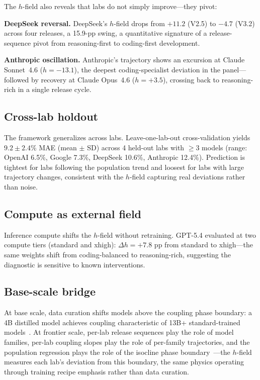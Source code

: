 \documentclass{article}
\begin{document}
The $h$-field also reveals that labs do not simply improve---they pivot:

\textbf{DeepSeek reversal.}
DeepSeek's $h$-field drops from $+11.2$ (V2.5) to $-4.7$ (V3.2) across four releases,
a 15.9-pp swing, a quantitative signature of a release-sequence pivot
from reasoning-first to coding-first development.

\textbf{Anthropic oscillation.}
Anthropic's trajectory shows an excursion at Claude Sonnet~4.6 ($h = -13.1$),
the deepest coding-specialist deviation in the panel---followed
by recovery at Claude Opus~4.6 ($h = +3.5$), crossing back to reasoning-rich in a single release cycle.

\subsection{Cross-lab holdout}

The framework generalizes across labs.
Leave-one-lab-out cross-validation yields $9.2 \pm 2.4$\% MAE (mean $\pm$ SD)
across 4 held-out labs with $\geq 3$ models
(range: OpenAI 6.5\%, Google 7.3\%, DeepSeek 10.6\%, Anthropic 12.4\%).
Prediction is tightest for labs following the population trend and loosest for labs with large
trajectory changes, consistent with the $h$-field capturing real deviations rather than noise.

\subsection{Compute as external field}

Inference compute shifts the $h$-field without retraining.
GPT-5.4 evaluated at two compute tiers (standard and xhigh):
$\Delta h = +7.8$ pp from standard to xhigh---the same weights
shift from coding-balanced to reasoning-rich,
suggesting the diagnostic is sensitive to known interventions.

\subsection{Base-scale bridge}

At base scale, data curation shifts models above the coupling phase boundary:
a 4B distilled model achieves coupling characteristic of 13B+ standard-trained
models~\cite{amin2026lying}.
At frontier scale, per-lab release sequences play the role of model families,
per-lab coupling slopes play the role of per-family trajectories,
and the population regression plays the role of the isocline phase
boundary~\cite{amin2026lying}---the $h$-field measures each lab's deviation
from this boundary, the same physics operating through training recipe
emphasis rather than data curation.
\end{document}
